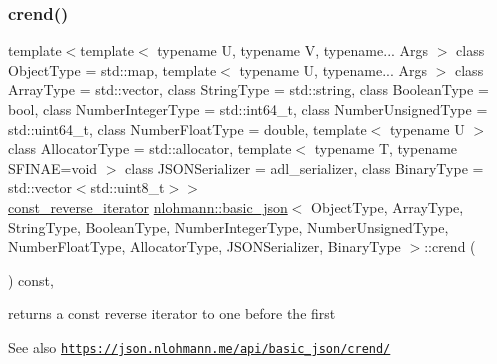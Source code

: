 \subsubsection{\texorpdfstring{crend()}{crend()}}
{\footnotesize\ttfamily template$<$template$<$ typename U, typename V, typename... Args $>$ class Object\+Type = std\+::map, template$<$ typename U, typename... Args $>$ class Array\+Type = std\+::vector, class String\+Type  = std\+::string, class Boolean\+Type  = bool, class Number\+Integer\+Type  = std\+::int64\+\_\+t, class Number\+Unsigned\+Type  = std\+::uint64\+\_\+t, class Number\+Float\+Type  = double, template$<$ typename U $>$ class Allocator\+Type = std\+::allocator, template$<$ typename T, typename S\+F\+I\+N\+A\+E=void $>$ class J\+S\+O\+N\+Serializer = adl\+\_\+serializer, class Binary\+Type  = std\+::vector$<$std\+::uint8\+\_\+t$>$$>$ \\
\hyperlink{classnlohmann_1_1basic__json_aa7dba16ed9ee97380aeb17a207dd919a}{const\+\_\+reverse\+\_\+iterator} \hyperlink{classnlohmann_1_1basic__json}{nlohmann\+::basic\+\_\+json}$<$ Object\+Type, Array\+Type, String\+Type, Boolean\+Type, Number\+Integer\+Type, Number\+Unsigned\+Type, Number\+Float\+Type, Allocator\+Type, J\+S\+O\+N\+Serializer, Binary\+Type $>$\+::crend (\begin{DoxyParamCaption}{ }\end{DoxyParamCaption}) const\hspace{0.3cm}{\ttfamily [inline]}, {\ttfamily [noexcept]}}



returns a const reverse iterator to one before the first 

\begin{DoxySeeAlso}{See also}
\href{https://json.nlohmann.me/api/basic_json/crend/}{\tt https\+://json.\+nlohmann.\+me/api/basic\+\_\+json/crend/} 
\end{DoxySeeAlso}
\mbox{\label{classnlohmann_1_1basic__json_a1c1f21327df91a4dd6c5f5a107240385}} 
